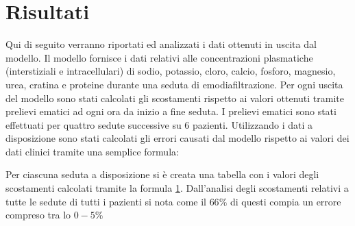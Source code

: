 \documentclass[10pt,twoside]{book}
\begin{document}
\chapter{Risultati}
Qui di seguito verranno riportati ed analizzati i dati ottenuti in uscita dal modello.
Il modello fornisce i dati relativi alle concentrazioni plasmatiche (interstiziali e intracellulari) di sodio, potassio, cloro, calcio, fosforo, magnesio, urea, cratina e proteine durante una seduta di emodiafiltrazione. Per ogni uscita del modello sono stati calcolati gli scostamenti rispetto ai valori ottenuti tramite prelievi ematici ad ogni ora da inizio a fine seduta. I prelievi ematici sono stati effettuati per quattro sedute successive su 6 pazienti. 
Utilizzando i dati a disposizione sono stati calcolati gli errori causati dal modello rispetto ai valori dei dati clinici tramite una semplice formula: 

\newline
Per ciascuna seduta a disposizione si è creata una tabella con i valori degli scostamenti calcolati tramite la formula \ref{}.
Dall'analisi degli scostamenti relativi a tutte le sedute di tutti i pazienti si nota come il $66\%$ di questi compia un errore compreso tra lo $0-5\%$
\end{document}
